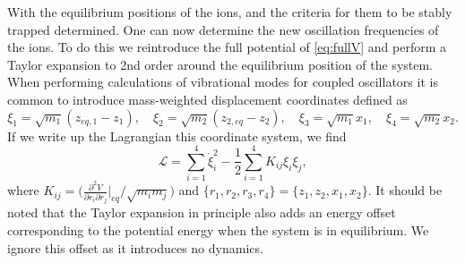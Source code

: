 With the equilibrium positions of the ions, and the criteria for them to be stably trapped determined. One can now determine the new oscillation frequencies of the ions. To do this we reintroduce the full potential of \cref{eq:fullV} and perform a Taylor expansion to 2nd order around the equilibrium position of the system. When performing calculations of vibrational modes for coupled oscillators it is common to introduce mass-weighted displacement coordinates defined as
\begin{equation}
    \xi_1 = \sqrt{m_1}(z_{eq,1}-z_1),\quad \xi_2 = \sqrt{m_2}(z_{2,eq}-z_2),\quad \xi_3 = \sqrt{m_1}x_1,\quad \xi_4 = \sqrt{m_2}x_2.
\end{equation}
If we write up the Lagrangian this coordinate system, we find
\begin{equation}
    \mathcal{L} = \sum_{i=1}^4 \dot{\xi}_i^2 - \frac{1}{2} \sum_{i = 1}^4K_{ij}\xi_i\xi_j,
\end{equation}
where $K_{ij} = \bigg(\frac{\partial^2 V}{\partial r_i\partial r_j}\bigg\vert_{eq}/\sqrt{m_im_j}\bigg)$ and $\{r_1,r_2,r_3,r_4\} = \{z_1,z_2,x_1,x_2\}$. It should be noted that the Taylor expansion in principle also adds an energy offset corresponding to the potential energy when the system is in equilibrium. We ignore this offset as it introduces no dynamics.

